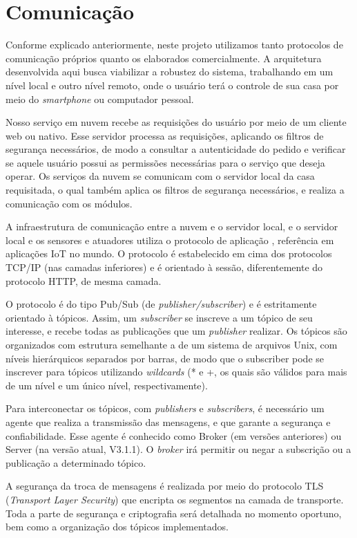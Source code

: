 \section{Comunicação}
Conforme explicado anteriormente, neste projeto utilizamos tanto protocolos de comunicação próprios quanto os elaborados comercialmente. A arquitetura desenvolvida aqui busca viabilizar a robustez do sistema, trabalhando em um nível local e outro nível remoto, onde o usuário terá o controle de sua casa por meio do \textit{smartphone} ou computador pessoal.

Nosso serviço em nuvem recebe as requisições do usuário por meio de um cliente web ou nativo. Esse servidor processa as requisições, aplicando os filtros de segurança necessários, de modo a consultar a autenticidade do pedido e verificar se aquele usuário possui as permissões necessárias para o serviço que deseja operar. Os serviços da nuvem se comunicam com o servidor local da casa requisitada, o qual também aplica os filtros de segurança necessários, e realiza a comunicação com os módulos.

A infraestrutura de comunicação entre a nuvem e o servidor local, e o servidor local e os sensores e atuadores utiliza o protocolo de aplicação \wmqtt{}, referência em aplicações IoT no mundo. O protocolo \wmqtt{} é estabelecido em cima dos protocolos TCP/IP (nas camadas inferiores) e é orientado à sessão, diferentemente do protocolo HTTP, de mesma camada.

O protocolo \wmqtt{} é do tipo Pub/Sub (de \textit{publisher/subscriber}) e é estritamente orientado à tópicos. Assim, um \textit{subscriber} se inscreve a um tópico de seu interesse, e recebe todas as publicações que um \textit{publisher} realizar. Os tópicos são organizados com estrutura semelhante a de um sistema de arquivos Unix, com níveis hierárquicos separados por barras, de modo que o subscriber pode se inscrever para tópicos utilizando \textit{wildcards} (* e +, os quais são válidos para mais de um nível e um único nível, respectivamente).

Para interconectar os tópicos, com \textit{publishers} e \textit{subscribers}, é necessário um agente que realiza a transmissão das mensagens, e que garante a segurança e confiabilidade. Esse agente é conhecido como Broker (em versões anteriores) ou Server (na versão atual, V3.1.1). O \textit{broker} irá permitir ou negar a subscrição ou a publicação a determinado tópico.

A segurança da troca de mensagens é realizada por meio do protocolo TLS (\textit{Transport Layer Security}) que encripta os segmentos na camada de transporte. Toda a parte de segurança e criptografia será detalhada no momento oportuno, bem como a organização dos tópicos implementados. %

